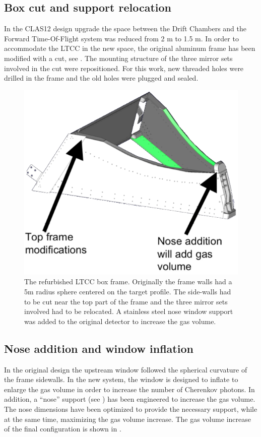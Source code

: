 \subsection{Box cut and support relocation }

In the CLAS12 design upgrade the space between the Drift Chambers and the Forward Time-Of-Flight system was reduced from 2 m to 1.5 m.
In order to accommodate the LTCC in the new space, the original aluminum frame has been modified with a cut, see .
The mounting structure of the three mirror sets involved in the cut were repositioned. For this work, new threaded holes were
drilled in the frame and the old holes were plugged and sealed.

\begin{figure}
	\centering
	\includegraphics[width=1.0\columnwidth, height=0.75\columnwidth]{img/boxCut.png}
	\caption{The refurbished LTCC box frame. Originally the frame walls had a 5m radius sphere centered on the target profile.
            The side-walls had to be cut near the top part of the frame and the three mirror sets involved had to be relocated.
			A stainless steel nose window support was added to the original detector to increase the gas volume.}
	\label{fig:boxCut}
\end{figure}


\subsection{Nose addition and window inflation}

In the original design the upstream window followed the spherical curvature of the frame sidewalls. In the new system, the window is
designed to inflate to enlarge the gas volume in order to increase the number of Cherenkov photons. In addition, a ``nose''
support (see ) has been engineered to increase the gas volume.
The nose dimensions have been optimized to provide the necessary support, while at the same time, maximizing the gas volume increase.
The gas volume increase of the final configuration is shown in .


